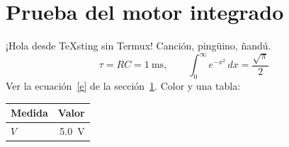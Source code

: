 \documentclass{article}
\begin{document}
\section{Prueba del motor integrado}\label{s}
¡Hola desde TeXsting sin Termux! Canción, pingüino, ñandú.
\begin{equation}\label{e} \tau = RC = \SI{1}{\milli\second}, \qquad \int_0^\infty e^{-x^2}\,dx = \frac{\sqrt\pi}{2} \end{equation}
Ver la ecuación~\eqref{e} de la sección~\ref{s}. {\color{blue}Color} y una tabla:
\begin{center}\begin{tabular}{lr}\toprule Medida & Valor\\\midrule $V$ & \SI{5.0}{\volt}\\\bottomrule\end{tabular}\end{center}
\end{document}
